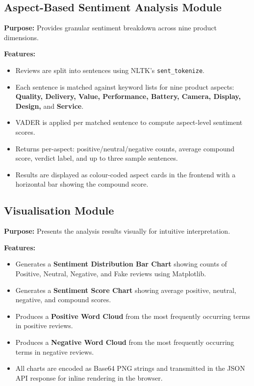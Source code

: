\documentclass[12pt,a4paper]{report}
\begin{document}
\subsection{Aspect-Based Sentiment Analysis Module}

\textbf{Purpose:} Provides granular sentiment breakdown across nine product dimensions.

\textbf{Features:}
\begin{itemize}
  \item Reviews are split into sentences using NLTK's \texttt{sent\_tokenize}.
  \item Each sentence is matched against keyword lists for nine product aspects: \textbf{Quality, Delivery, Value, Performance, Battery, Camera, Display, Design,} and \textbf{Service}.
  \item VADER is applied per matched sentence to compute aspect-level sentiment scores.
  \item Returns per-aspect: positive/neutral/negative counts, average compound score, verdict label, and up to three sample sentences.
  \item Results are displayed as colour-coded aspect cards in the frontend with a horizontal bar showing the compound score.
\end{itemize}

\subsection{Visualisation Module}

\textbf{Purpose:} Presents the analysis results visually for intuitive interpretation.

\textbf{Features:}
\begin{itemize}
  \item Generates a \textbf{Sentiment Distribution Bar Chart} showing counts of Positive, Neutral, Negative, and Fake reviews using Matplotlib.
  \item Generates a \textbf{Sentiment Score Chart} showing average positive, neutral, negative, and compound scores.
  \item Produces a \textbf{Positive Word Cloud} from the most frequently occurring terms in positive reviews.
  \item Produces a \textbf{Negative Word Cloud} from the most frequently occurring terms in negative reviews.
  \item All charts are encoded as Base64 PNG strings and transmitted in the JSON API response for inline rendering in the browser.
\end{itemize}
\end{document}
